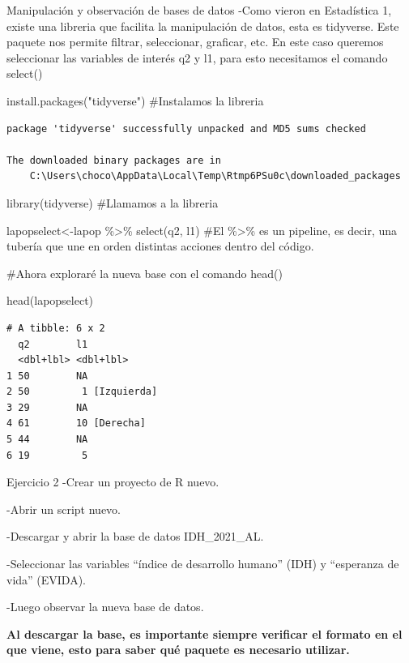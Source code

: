 \documentclass[
  30pt,
  ignorenonframetext,
]{beamer}
\newenvironment{Shaded}{\begin{snugshade}}{\end{snugshade}}
\newcommand{\CommentTok}[1]{\textcolor[rgb]{0.37,0.37,0.37}{#1}}
\newcommand{\FunctionTok}[1]{\textcolor[rgb]{0.28,0.35,0.67}{#1}}
\newcommand{\NormalTok}[1]{\textcolor[rgb]{0.00,0.23,0.31}{#1}}
\newcommand{\OtherTok}[1]{\textcolor[rgb]{0.00,0.23,0.31}{#1}}
\newcommand{\SpecialCharTok}[1]{\textcolor[rgb]{0.37,0.37,0.37}{#1}}
\newcommand{\StringTok}[1]{\textcolor[rgb]{0.13,0.47,0.30}{#1}}
\begin{document}
\begin{frame}[fragile]{Manipulación y observación de bases de datos}
\label{manipulaciuxf3n-y-observaciuxf3n-de-bases-de-datos-1}
-Como vieron en Estadística 1, existe una libreria que facilita la
manipulación de datos, esta es tidyverse. Este paquete nos permite
filtrar, seleccionar, graficar, etc. En este caso queremos seleccionar
las variables de interés q2 y l1, para esto necesitamos el comando
select()

\begin{Shaded}
\begin{Highlighting}[]
\FunctionTok{install.packages}\NormalTok{(}\StringTok{"tidyverse"}\NormalTok{) }\CommentTok{\#Instalamos la libreria}
\end{Highlighting}
\end{Shaded}

\begin{verbatim}
package 'tidyverse' successfully unpacked and MD5 sums checked

The downloaded binary packages are in
    C:\Users\choco\AppData\Local\Temp\Rtmp6PSu0c\downloaded_packages
\end{verbatim}

\begin{Shaded}
\begin{Highlighting}[]
\FunctionTok{library}\NormalTok{(tidyverse) }\CommentTok{\#Llamamos a la libreria}

\NormalTok{lapopselect}\OtherTok{\textless{}{-}}\NormalTok{lapop }\SpecialCharTok{\%\textgreater{}\%} \FunctionTok{select}\NormalTok{(q2, l1) }\CommentTok{\#El \%\textgreater{}\% es un pipeline, es decir, una tubería que une en orden distintas acciones dentro del código.}



\CommentTok{\#Ahora exploraré la nueva base con el comando head()}

\FunctionTok{head}\NormalTok{(lapopselect)}
\end{Highlighting}
\end{Shaded}

\begin{verbatim}
# A tibble: 6 x 2
  q2        l1            
  <dbl+lbl> <dbl+lbl>     
1 50        NA            
2 50         1 [Izquierda]
3 29        NA            
4 61        10 [Derecha]  
5 44        NA            
6 19         5            
\end{verbatim}
\end{frame}

\begin{frame}{Ejercicio 2}
\label{ejercicio-2}
-Crear un proyecto de R nuevo.

-Abrir un script nuevo.

-Descargar y abrir la base de datos IDH\_2021\_AL.

-Seleccionar las variables ``índice de desarrollo humano'' (IDH) y
``esperanza de vida'' (EVIDA).

-Luego observar la nueva base de datos.

\textbf{Al descargar la base, es importante siempre verificar el formato
en el que viene, esto para saber qué paquete es necesario utilizar.}
\end{frame}
\end{document}
